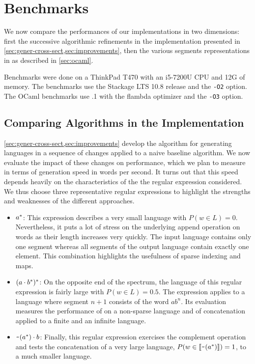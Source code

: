 \section{Benchmarks}
\label{sec:bench}


We now compare the performances of our implementations in two dimensions:
first the successive algorithmic refinements in the \haskell
implementation presented in \cref{sec:gener-cross-sect,sec:improvements},
then the various segments representations in \ocaml
as described in \cref{sec:ocaml}.

Benchmarks were done on a ThinkPad T470 with an i5-7200U CPU and 12G of memory.
The \haskell benchmarks use the Stackage LTS 10.8 release and the \texttt{-O2} option.
The OCaml benchmarks use .1 with the flambda optimizer and the
\texttt{-O3} option.

\subsection{Comparing Algorithms in the \haskell Implementation}

\cref{sec:gener-cross-sect,sec:improvements} develop the
algorithm for generating languages in a sequence of changes applied to
a naive baseline algorithm. We now evaluate the impact of these
changes on performance, which we plan to measure in terms of
generation speed in words per second. It turns out that this speed
depends heavily on the characteristics of the the regular expression
considered. We thus choose three representative regular expressions to highlight the
strengths and weaknesses of the different approaches.
\begin{itemize}
\item $a^*$: This expression describes a very small language with $P (w\in L) = 0$.
  Nevertheless, it puts a lot of stress on the underlying
  append operation on words as their length increases very quickly.
  The input language contains only one segment whereas all segments of
  the output language contain exactly one element. This combination
  highlights the usefulness of sparse indexing and maps.
\item $(a \cdot{b^*})^*$: On the opposite end of the
  spectrum, the language of this regular expression is fairly large
  with $P (w\in L)=0.5$. The expression applies  to a
  language where segment $n+1$ consists of the word $ab^n$. Its
  evaluation measures the performance of  on a non-sparse
  language and of {concatenation} applied to a finite and an infinite
  language.
\item $\texttt{\textasciitilde}{(a^*)} \cdot{b}$: Finally, this regular
  expression exercises the complement operation and tests the
  concatenation of a very large language, 
  $P (w\in \llbracket\texttt{\textasciitilde}{(a^*)}\rrbracket) = 1$, to a much smaller
  language.
\end{itemize}

